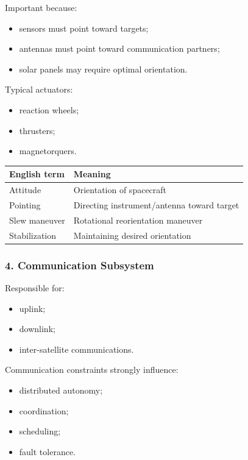 \documentclass[10pt,a4paper,twocolumn]{article}
\begin{document}
Important because:
\begin{itemize}
    \item sensors must point toward targets;
    \item antennas must point toward communication partners;
    \item solar panels may require optimal orientation.
\end{itemize}

Typical actuators:
\begin{itemize}
    \item reaction wheels;
    \item thrusters;
    \item magnetorquers.
\end{itemize}

\begin{vocabbox}
    \begin{tabularx}{\columnwidth}{lX}
        \toprule
        English term  & Meaning                                    \\
        \midrule
        Attitude      & Orientation of spacecraft                  \\
        Pointing      & Directing instrument/antenna toward target \\
        Slew maneuver & Rotational reorientation maneuver          \\
        Stabilization & Maintaining desired orientation            \\
        \bottomrule
    \end{tabularx}
\end{vocabbox}


\subsubsection*{4. Communication Subsystem}

Responsible for:
\begin{itemize}
    \item uplink;
    \item downlink;
    \item inter-satellite communications.
\end{itemize}

Communication constraints strongly influence:
\begin{itemize}
    \item distributed autonomy;
    \item coordination;
    \item scheduling;
    \item fault tolerance.
\end{itemize}
\end{document}
